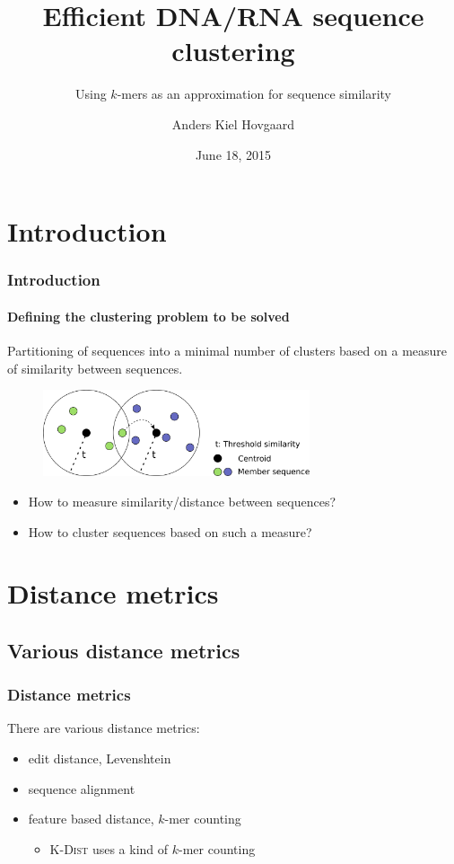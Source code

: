 \documentclass{beamer}
\title{Efficient DNA/RNA sequence clustering}
\subtitle{Using $k$-mers as an approximation for sequence similarity}
\author{Anders Kiel Hovgaard}
\institute{Department of Computer Science, University of Copenhagen}
\date{June 18, 2015}
\begin{document}
\frame{\titlepage}

\section{Introduction}

\begin{frame}
  \frametitle{Introduction}
  \framesubtitle{Defining the clustering problem to be solved}

  Partitioning of sequences into a minimal number of clusters based on a
  measure of similarity between sequences.

  \begin{figure}
    \includegraphics[width=0.7\textwidth]{graphics/centroid-clustering.pdf}
  \end{figure}

  \begin{itemize}
    \item How to measure similarity/distance between sequences?
    \item How to cluster sequences based on such a measure?
  \end{itemize}
\end{frame}

\section{Distance metrics}
\subsection{Various distance metrics}

\begin{frame}
  \frametitle{Distance metrics}

  There are various distance metrics:

  \begin{itemize}
    \item edit distance, Levenshtein
    \item sequence alignment
    \item feature based distance, $k$-mer counting
      \begin{itemize}
        \item \textsc{K-Dist} uses a kind of $k$-mer counting
      \end{itemize}
  \end{itemize}
\end{frame}
\end{document}
